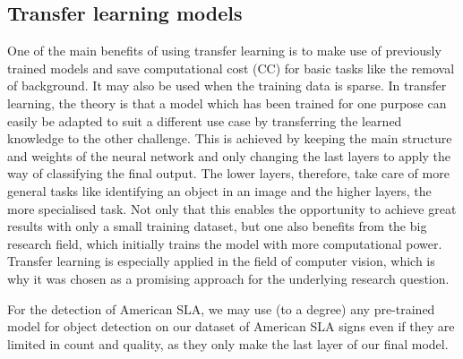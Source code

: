 \subsection{Transfer learning models}\label{chapter_models}
One of the main benefits of using transfer learning is to make use of previously trained models and save computational cost (CC) for basic tasks like the removal of background. It may also be used when the training data is sparse. In transfer learning, the theory is that a model which has been trained for one purpose can easily be adapted to suit a different use case by transferring the learned knowledge to the other challenge\cite{zhuang2020comprehensive}. This is achieved by keeping the main structure and weights of the neural network and only changing the last layers to apply the way of classifying the final output. The lower layers, therefore, take care of more general tasks like identifying an object in an image\cite{neyshabur2021transferred} and the higher layers, the more specialised task. Not only that this enables the opportunity to achieve great results with only a small training dataset, but one also benefits from the big research field, which initially trains the model with more computational power. Transfer learning is especially applied in the field of computer vision, which is why it was chosen as a promising approach for the underlying research question.

For the detection of American SLA, we may use (to a degree) any pre-trained model for object detection on our dataset of American SLA signs even if they are limited in count and quality, as they only make the last layer of our final model.

